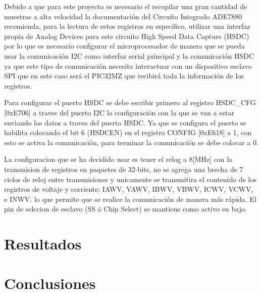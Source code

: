 \documentclass[letterpaper,12pt,oneside]{book}
\begin{document}
			Debido a que para este proyecto es necesario el recopilar una gran cantidad de muestras a alta velocidad la documentación del Circuito Integrado ADE7880 recomienda, para la lectura de estos registros en específico, utilizar una interfaz propia de Analog Devices para este circuito High Speed Data Capture (HSDC) por lo que es necesario configurar el microprocesador de manera que se pueda usar la comunicación I2C como interfaz serial principal y la comunicación HSDC ya que este tipo de comunicación necesita interactuar con un dispositivo esclavo SPI que en este caso será el PIC32MZ que recibirá toda la información de los registros.

			Para configurar el puerto HSDC se debe escribir primero al registro HSDC\_CFG [0xE706] a traves del puerto I2C la configuración con la que se van a estar enviando los datos a traves del puerto HSDC. Ya que se configura el puerto se habilita colocando el bit 6 (HSDCEN) en el registro CONFIG [0xE618] a 1, con esto se activa la comunicación, para terminar la comunicación se debe colocar a 0.

			La configuracion que se ha decidido usar es tener el relog a 8[MHz] con la transmision de registros en paquetes de 32-bits, no se agrega una brecha de 7 ciclos de reloj entre transmisiones y unicamente se transmitira el contenido de los registros de voltaje y corriente: IAWV, VAWV, IBWV, VBWV, ICWV, VCWV, e INWV. lo que permite que se realice la comunicación de manera más rápida. El pin de selccion de esclavo (SS ó Chip Select) se mantiene como activo en bajo.

	\chapter{Resultados}

	\chapter{Conclusiones}


	\backmatter%
\end{document}
